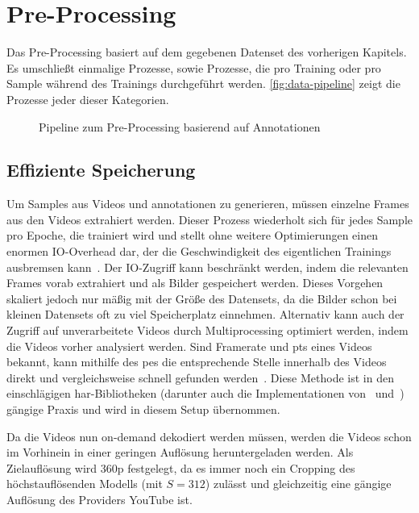 \section{Pre-Processing}
\label{sec:pre-processing}

Das Pre-Processing basiert auf dem gegebenen Datenset des vorherigen Kapitels.
Es umschließt einmalige Prozesse, sowie Prozesse, die pro Training oder pro Sample während des Trainings durchgeführt werden.
\autoref{fig:data-pipeline} zeigt die Prozesse jeder dieser Kategorien.

\begin{figure}
    \centering
    \caption{Pipeline zum Pre-Processing basierend auf Annotationen}
    \label{fig:data-pipeline}
\end{figure}

\subsection{Effiziente Speicherung}
\label{subsec:effiziente-speicherung}

Um Samples aus Videos und \gls{annotationen} zu generieren, müssen einzelne Frames aus den Videos extrahiert werden.
Dieser Prozess wiederholt sich für jedes Sample pro Epoche, die trainiert wird und stellt ohne weitere Optimierungen einen enormen IO-Overhead dar, der die Geschwindigkeit des eigentlichen Trainings ausbremsen kann~\cite{Wu20}.
Der IO-Zugriff kann \zB beschränkt werden, indem die relevanten Frames vorab extrahiert und als Bilder gespeichert werden.
Dieses Vorgehen skaliert jedoch nur mäßig mit der Größe des Datensets, da die Bilder schon bei kleinen Datensets oft zu viel Speicherplatz einnehmen.
Alternativ kann auch der Zugriff auf unverarbeitete Videos durch Multiprocessing optimiert werden, indem die Videos vorher analysiert werden.
Sind Framerate und \gls{pts} eines Videos bekannt, kann mithilfe des \gls{pes} die entsprechende Stelle innerhalb des Videos direkt und vergleichsweise schnell gefunden werden~\cite{Fischer10}.
Diese Methode ist in den einschlägigen \gls{har}-Bibliotheken (darunter auch die Implementationen von~\cite{Feichtenhofer18} und~\cite{Wang19}) gängige Praxis und wird in diesem Setup übernommen.

Da die Videos nun on-demand dekodiert werden müssen, werden die Videos schon im Vorhinein in einer geringen Auflösung heruntergeladen werden.
Als Zielauflösung wird 360p festgelegt, da es immer noch ein Cropping des höchstauflösenden Modells (mit $S=312$) zulässt und gleichzeitig eine gängige Auflösung des Providers YouTube ist.

